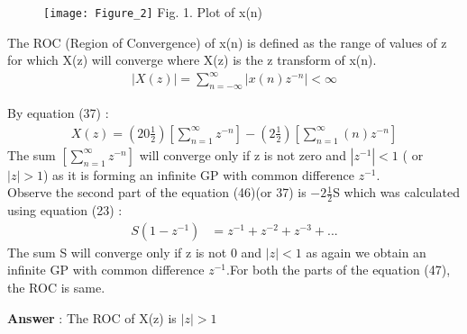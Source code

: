 \documentclass[journal,12pt,twocolumn]{IEEEtran}
\theoremstyle{remark}
\begin{document}
\begin{figure}[!h]
    \begin{center}
    \texttt{[image: Figure\_2]}
    Fig. 1. Plot of x(n) \\
    \end{center}
\end{figure}

\FloatBarrier

The ROC (Region of Convergence) of x(n) is defined as the range of values of z for which X(z) will converge where X(z) is the z transform of x(n).\\
\begin{align}
   \left|X(z)\right| = \sum_{n = -\infty}^{\infty}\left|x(n)z^{-n}\right| < \infty
\end{align}

By equation (37) :\\
\begin{align}
X(z) = \left(20\frac{1}{2}\right)\left[\sum_{n=1}^{\infty}z^{-n} \right] - \left(2\frac{1}{2}\right)\left[ \sum_{n=1}^{\infty}\left(n\right)z^{-n} \right]
\end{align}
The sum $ \left[\sum_{n=1}^{\infty}z^{-n} \right]$ will converge only if z is not zero and $\left|z^{-1}\right| < 1$ ( or $|z| > 1$) as it is forming an infinite GP with common difference $z^{-1}$.\\

Observe the second part of the equation (46)(or 37) is $-2\frac{1}{2}$S which was calculated using equation (23) : \\
\begin{align}
    S(1-z^{-1}) &= z^{-1} + z^{-2} + z^{-3} + ... 
\end{align}
The sum S will converge only if z is not 0 and $\left|z\right| < 1$ as again we obtain an infinite GP with common difference $z^{-1}$.For both the parts of the equation (47), the ROC is same.

\vspace{4mm}

\large\textbf{Answer} : \normalsize The ROC of X(z) is  $|z| > 1$
\end{document}
